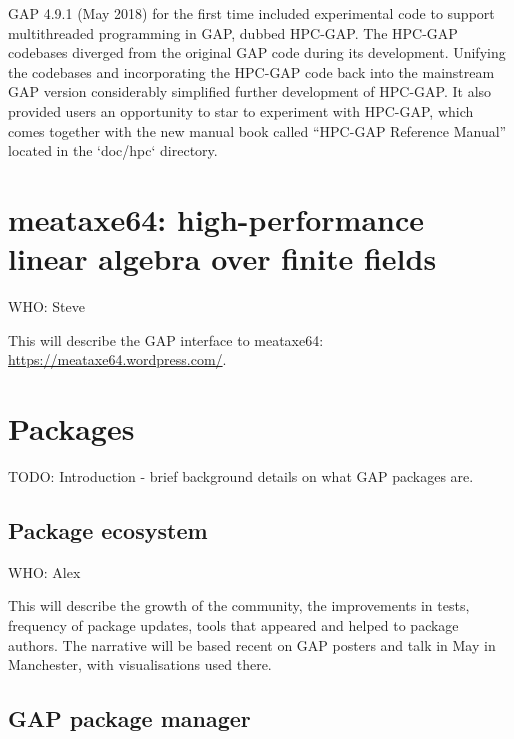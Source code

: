 \documentclass{deliverablereport}
\begin{document}
GAP 4.9.1 (May 2018) for the first time included experimental code to 
support multithreaded programming in GAP, dubbed HPC-GAP. The HPC-GAP 
codebases diverged from the original GAP code during its development. 
Unifying the codebases and incorporating the HPC-GAP code back into the 
mainstream GAP version considerably simplified further development of 
HPC-GAP. It also provided users an opportunity to star to experiment 
with HPC-GAP, which comes together with the new manual book called 
``HPC-GAP Reference Manual'' located in the `doc/hpc` directory.




\section{meataxe64: high-performance linear algebra over finite fields}

WHO: Steve

This will describe the GAP interface to meataxe64: \url{https://meataxe64.wordpress.com/}.


\section{Packages}

TODO: Introduction - brief background details on what GAP packages are.

\subsection{Package ecosystem}

WHO: Alex

This will describe the growth of the community, the improvements in tests, frequency
of package updates, tools that appeared and helped to package authors. The narrative
will be based recent on GAP posters and talk in May in Manchester, with visualisations
used there.

\subsection{GAP package manager}
\end{document}
